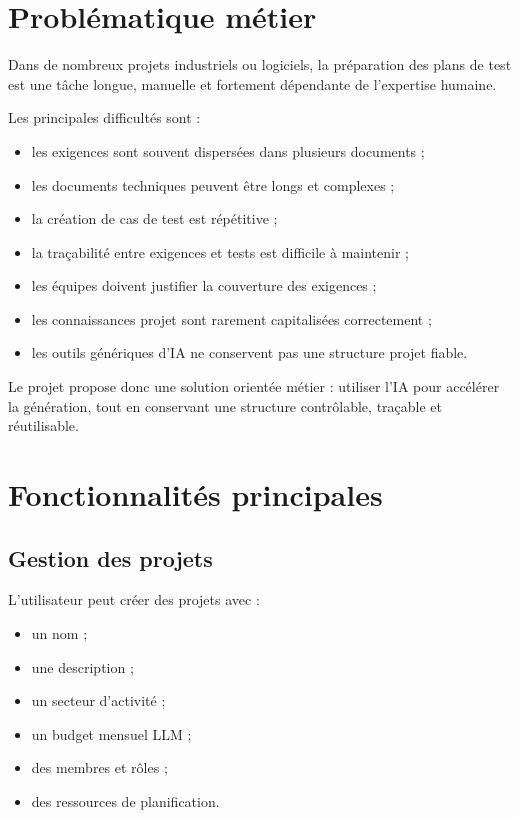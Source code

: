 \documentclass[
  french,
]{report}
\providecommand{\tightlist}{%
  \setlength{\itemsep}{0pt}\setlength{\parskip}{0pt}}
\begin{document}
\chapter{Problématique métier}\label{probluxe9matique-muxe9tier}

Dans de nombreux projets industriels ou logiciels, la préparation des
plans de test est une tâche longue, manuelle et fortement dépendante de
l'expertise humaine.

Les principales difficultés sont :

\begin{itemize}
\tightlist
\item
  les exigences sont souvent dispersées dans plusieurs documents ;
\item
  les documents techniques peuvent être longs et complexes ;
\item
  la création de cas de test est répétitive ;
\item
  la traçabilité entre exigences et tests est difficile à maintenir ;
\item
  les équipes doivent justifier la couverture des exigences ;
\item
  les connaissances projet sont rarement capitalisées correctement ;
\item
  les outils génériques d'IA ne conservent pas une structure projet
  fiable.
\end{itemize}

Le projet propose donc une solution orientée métier : utiliser l'IA pour
accélérer la génération, tout en conservant une structure contrôlable,
traçable et réutilisable.

\chapter{Fonctionnalités
principales}\label{fonctionnalituxe9s-principales}

\section{Gestion des projets}\label{gestion-des-projets}

L'utilisateur peut créer des projets avec :

\begin{itemize}
\tightlist
\item
  un nom ;
\item
  une description ;
\item
  un secteur d'activité ;
\item
  un budget mensuel LLM ;
\item
  des membres et rôles ;
\item
  des ressources de planification.
\end{itemize}
\end{document}
